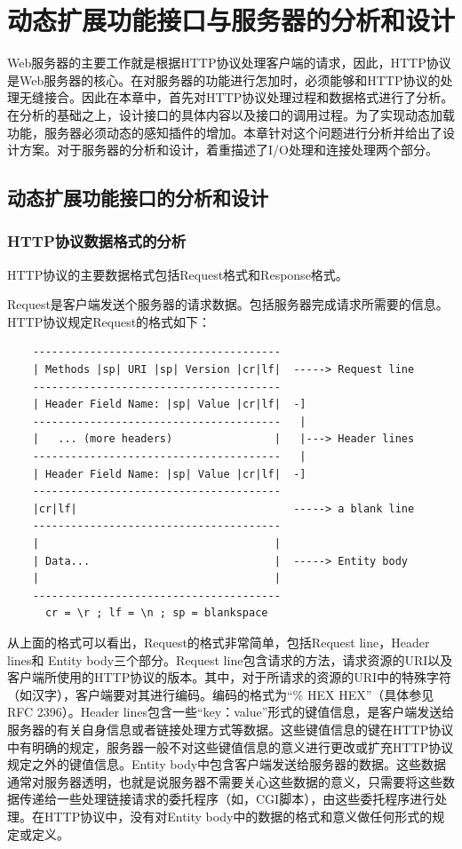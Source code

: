 \documentclass[12pt, twoside, a4paper, xetex]{report}
\begin{document}
\chapter{动态扩展功能接口与服务器的分析和设计}
	
	Web服务器的主要工作就是根据HTTP协议处理客户端的请求，因此，HTTP协议是Web服务器的核心。在对服务器的功能进行怎加时，必须能够和HTTP协议的处理无缝接合。因此在本章中，首先对HTTP协议处理过程和数据格式进行了分析。在分析的基础之上，设计接口的具体内容以及接口的调用过程。为了实现动态加载功能，服务器必须动态的感知插件的增加。本章针对这个问题进行分析并给出了设计方案。对于服务器的分析和设计，着重描述了I/O处理和连接处理两个部分。
	
\section{动态扩展功能接口的分析和设计}
\subsection{HTTP协议数据格式的分析}
	HTTP协议的主要数据格式包括Request格式和Response格式。
	
	Request是客户端发送个服务器的请求数据。包括服务器完成请求所需要的信息。HTTP协议规定Request的格式如下：
\begin{verbatim}
    ---------------------------------------
    | Methods |sp| URI |sp| Version |cr|lf|  -----> Request line
    ---------------------------------------
    | Header Field Name: |sp| Value |cr|lf|  -]
    ---------------------------------------   |
    |   ... (more headers)                |   |---> Header lines
    ---------------------------------------   |
    | Header Field Name: |sp| Value |cr|lf|  -]
    ---------------------------------------
    |cr|lf|                                  -----> a blank line
    ---------------------------------------
    |                                     |
    | Data...                             |  -----> Entity body
    |                                     |
    ---------------------------------------
      cr = \r ; lf = \n ; sp = blankspace
\end{verbatim}
 	
 	从上面的格式可以看出，Request的格式非常简单，包括Request line，Header lines和 Entity body三个部分。Request line包含请求的方法，请求资源的URI以及客户端所使用的HTTP协议的版本。其中，对于所请求的资源的URI中的特殊字符（如汉字），客户端要对其进行编码。编码的格式为“\% HEX HEX”（具体参见RFC 2396）。Header lines包含一些“key：value”形式的键值信息，是客户端发送给服务器的有关自身信息或者链接处理方式等数据。这些键值信息的键在HTTP协议中有明确的规定，服务器一般不对这些键值信息的意义进行更改或扩充HTTP协议规定之外的键值信息。Entity body中包含客户端发送给服务器的数据。这些数据通常对服务器透明，也就是说服务器不需要关心这些数据的意义，只需要将这些数据传递给一些处理链接请求的委托程序（如，CGI脚本），由这些委托程序进行处理。在HTTP协议中，没有对Entity body中的数据的格式和意义做任何形式的规定或定义。
 	
\end{document}
